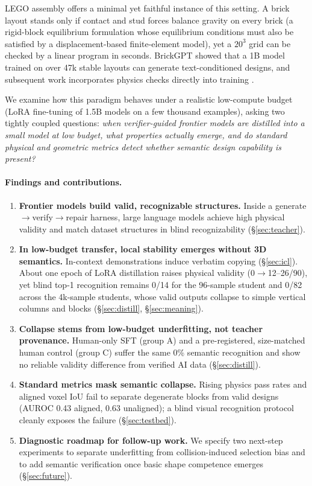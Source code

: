 \documentclass{article}
\begin{document}
LEGO assembly offers a minimal yet faithful instance of this setting. A brick layout stands only if contact and stud forces balance gravity on every brick (a rigid-block equilibrium formulation \cite{livesley1978,whiting2009} whose equilibrium conditions must also be satisfied by a displacement-based finite-element model), yet a $20^3$ grid can be checked by a linear program in seconds. BrickGPT \cite{pun2025brickgpt} showed that a 1B model trained on over 47k stable layouts can generate text-conditioned designs, and subsequent work incorporates physics checks directly into training \cite{stable2026,pvpo2026}.

We examine how this paradigm behaves under a realistic low-compute budget (LoRA fine-tuning of 1.5B models on a few thousand examples), asking two tightly coupled questions: \emph{when verifier-guided frontier models are distilled into a small model at low budget, what properties actually emerge, and do standard physical and geometric metrics detect whether semantic design capability is present?}

\paragraph{Findings and contributions.}
\begin{enumerate}[leftmargin=*,itemsep=1pt]
\item \textbf{Frontier models build valid, recognizable structures.} Inside a generate$\rightarrow$verify$\rightarrow$repair harness, large language models achieve high physical validity and match dataset structures in blind recognizability (\S\ref{sec:teacher}).
\item \textbf{In low-budget transfer, local stability emerges without 3D semantics.} In-context demonstrations induce verbatim copying (\S\ref{sec:icl}). About one epoch of LoRA distillation raises physical validity (0$\rightarrow$12--26/90), yet blind top-1 recognition remains 0/14 for the 96-sample student and 0/82 across the 4k-sample students, whose valid outputs collapse to simple vertical columns and blocks (\S\ref{sec:distill}, \S\ref{sec:meaning}).
\item \textbf{Collapse stems from low-budget underfitting, not teacher provenance.} Human-only SFT (group A) and a pre-registered, size-matched human control (group C) suffer the same 0\% semantic recognition and show no reliable validity difference from verified AI data (\S\ref{sec:distill}).
\item \textbf{Standard metrics mask semantic collapse.} Rising physics pass rates and aligned voxel IoU fail to separate degenerate blocks from valid designs (AUROC 0.43 aligned, 0.63 unaligned); a blind visual recognition protocol cleanly exposes the failure (\S\ref{sec:testbed}).
\item \textbf{Diagnostic roadmap for follow-up work.} We specify two next-step experiments to separate underfitting from collision-induced selection bias and to add semantic verification once basic shape competence emerges (\S\ref{sec:future}).
\end{enumerate}
\end{document}
